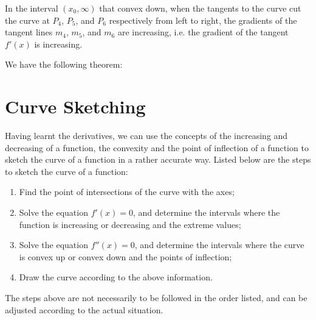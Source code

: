 In the interval $(x_0, \infty)$ that convex down, when the tangents to the
curve cut the curve at $P_4$, $P_5$, and $P_6$ respectively from left to right,
the gradients of the tangent lines $m_4$, $m_5$, and $m_6$ are increasing, i.e.
the gradient of the tangent $f'(x)$ is increasing.

We have the following theorem:
\begin{center}
\end{center}




\section{Curve Sketching}

Having learnt the derivatives, we can use the concepts of the increasing and
decreasing of a function, the convexity and the point of inflection of a
function to sketch the curve of a function in a rather accurate way. Listed
below are the steps to sketch the curve of a function:
\begin{enumerate}
    \item Find the point of intersections of the curve with the axes;
    \item Solve the equation $f'(x) = 0$, and determine the intervals where the function
          is increasing or decreasing and the extreme values;
    \item Solve the equation $f''(x) = 0$, and determine the intervals where the curve is
          convex up or convex down and the points of inflection;
    \item Draw the curve according to the above information.
\end{enumerate}
The steps above are not necessarily to be followed in the order listed, and can be adjusted according to the actual situation.

